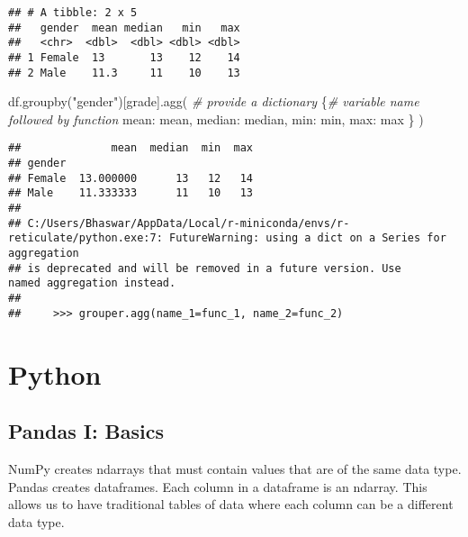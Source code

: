 \documentclass[
]{book}
\newenvironment{Shaded}{\begin{snugshade}}{\end{snugshade}}
\newcommand{\CommentTok}[1]{\textcolor[rgb]{0.56,0.35,0.01}{\textit{#1}}}
\newcommand{\NormalTok}[1]{#1}
\newcommand{\StringTok}[1]{\textcolor[rgb]{0.31,0.60,0.02}{#1}}
\begin{document}
\begin{verbatim}
## # A tibble: 2 x 5
##   gender  mean median   min   max
##   <chr>  <dbl>  <dbl> <dbl> <dbl>
## 1 Female  13       13    12    14
## 2 Male    11.3     11    10    13
\end{verbatim}

\begin{Shaded}
\begin{Highlighting}[]
\NormalTok{df.groupby(}\StringTok{"gender"}\NormalTok{)[}\StringTok{\textquotesingle{}grade\textquotesingle{}}\NormalTok{].agg(}
  \CommentTok{\# provide a dictionary}
\NormalTok{  \{}\CommentTok{\# variable name followed by function}
    \StringTok{\textquotesingle{}mean\textquotesingle{}}\NormalTok{: }\StringTok{\textquotesingle{}mean\textquotesingle{}}\NormalTok{,}
    \StringTok{\textquotesingle{}median\textquotesingle{}}\NormalTok{: }\StringTok{\textquotesingle{}median\textquotesingle{}}\NormalTok{,}
    \StringTok{\textquotesingle{}min\textquotesingle{}}\NormalTok{: }\StringTok{\textquotesingle{}min\textquotesingle{}}\NormalTok{,}
    \StringTok{\textquotesingle{}max\textquotesingle{}}\NormalTok{: }\StringTok{\textquotesingle{}max\textquotesingle{}}
\NormalTok{  \}}
\NormalTok{)}
\end{Highlighting}
\end{Shaded}

\begin{verbatim}
##              mean  median  min  max
## gender                             
## Female  13.000000      13   12   14
## Male    11.333333      11   10   13
## 
## C:/Users/Bhaswar/AppData/Local/r-miniconda/envs/r-reticulate/python.exe:7: FutureWarning: using a dict on a Series for aggregation
## is deprecated and will be removed in a future version. Use                 named aggregation instead.
## 
##     >>> grouper.agg(name_1=func_1, name_2=func_2)
\end{verbatim}

\hypertarget{python}{%
\chapter{Python}\label{python}}

\hypertarget{pandas-i-basics}{%
\section{Pandas I: Basics}\label{pandas-i-basics}}

NumPy creates ndarrays that must contain values that are of the same data type.
Pandas creates dataframes. Each column in a dataframe is an ndarray. This allows us to have
traditional tables of data where each column can be a different data type.
\end{document}
